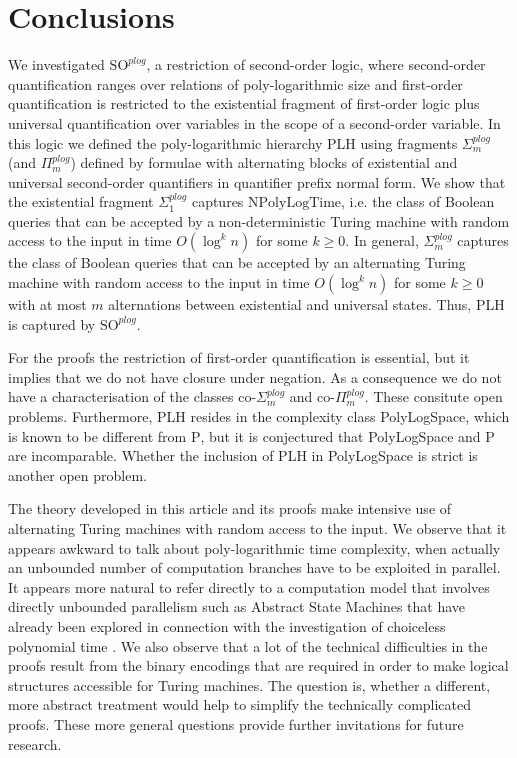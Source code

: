 \documentclass{article}
\newcommand{\npolylog}{\mathrm{NPolyLogTime}}
\begin{document}
\section{Conclusions}\label{sec:schluss}
We investigated $\mathrm{SO}^{\mathit{plog}}$, a restriction of second-order logic, where second-order quantification ranges over relations of poly-logarithmic size and first-order quantification is restricted to the existential fragment of first-order logic plus universal quantification over variables in the scope of a second-order variable. In this logic we defined the poly-logarithmic hierarchy PLH using fragments $\Sigma^{\mathit{plog}}_m$ (and $\Pi^{\mathit{plog}}_m$) defined by formulae with alternating blocks of existential and universal second-order quantifiers in quantifier prefix normal form. We show that the existential fragment $\Sigma^{\mathit{plog}}_1$ captures $\npolylog$, i.e. the class of Boolean queries that can be accepted by a non-deterministic Turing machine with random access to the input in time $O(\log^k n)$ for some $k \ge 0$. In general, $\Sigma^{\mathit{plog}}_m$ captures the class of Boolean queries that can be accepted by an alternating Turing machine with random access to the input in time $O(\log^k n)$ for some $k \ge 0$ with at most $m$ alternations between existential and universal states. Thus, PLH is captured by $\mathrm{SO}^{\mathit{plog}}$. 

For the proofs the restriction of first-order quantification is essential, but it implies that we do not have closure under negation. As a consequence we do not have a characterisation of the classes $\text{co-}\Sigma^{\mathit{plog}}_m$ and $\text{co-}\Pi^{\mathit{plog}}_m$. These consitute open problems. Furthermore, PLH resides in the complexity class PolyLogSpace, which is known to be different from $\mathrm{P}$, but it is conjectured that PolyLogSpace and $\mathrm{P}$ are incomparable. Whether the inclusion of PLH in PolyLogSpace is strict is another open problem.

The theory developed in this article and its proofs make intensive use of alternating Turing machines with random access to the input. We observe that it appears awkward to talk about poly-logarithmic time complexity, when actually an unbounded number of computation branches have to be exploited in parallel. It appears more natural to refer directly to a computation model that involves directly unbounded parallelism such as Abstract State Machines that have already been explored in connection with the investigation of choiceless polynomial time \cite{blass:apal1999}. We also observe that a lot of the technical difficulties in the proofs result from the binary encodings that are required in order to make logical structures accessible for Turing machines. The question is, whether a different, more abstract treatment would help to simplify the technically complicated proofs. These more general questions provide further invitations for future research.
\end{document}
